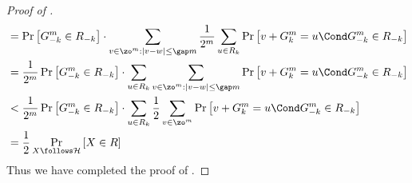 \begin{proof}[Proof of ]
\begin{align*}
			&= \Pr\left[ G^m_{-k}\in R_{-k} \right]
			\cdot \sum_{v\in\zo^m: \left|v-w\right|\le \gap m }\frac{1}{2^m} \sum_{u\in R_k}\Pr\left[ v+ G^m_k = u \Cond G^m_{-k}\in R_{-k}  \right]\\
			&= \frac{1}{2^m}  \Pr\left[ G^m_{-k}\in R_{-k} \right]
			\cdot \sum_{u\in R_k} \sum_{v\in\zo^m: \left|v-w\right|\le \gap m }\Pr\left[ v+ G^m_k = u \Cond G^m_{-k}\in R_{-k}  \right]\\
			&< \frac{1}{2^m}  \Pr\left[ G^m_{-k}\in R_{-k} \right]
			\cdot \sum_{u\in R_k} \frac{1}{2}\sum_{v\in\zo^m}\Pr\left[ v+ G^m_k = u \Cond G^m_{-k}\in R_{-k}  \right]\\
			&=\frac{1}{2} \Pr_{X\follows \mathcal{H}}\left[ X\in R\right]
		\end{align*}
%
Thus we have completed the proof of .
	\end{proof}


